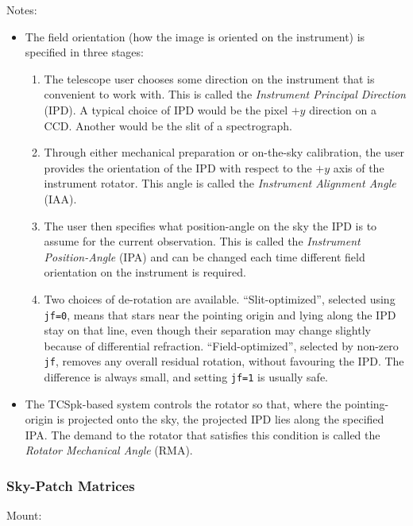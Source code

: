 \documentclass[12pt,fleqn,twoside]{article}
\renewcommand{\_}{{\tt\char'137}}     %
\newcommand{\notelist}  {\goodbreak \vspace{1ex} Notes:
                        \vspace{-3ex}}
\begin{document}
\notelist
\begin{itemize}
\item The field orientation (how the image is oriented on the
      instrument) is specified in three stages:
      \begin{enumerate}
      \item The telescope user chooses some direction on the
            instrument that is convenient to work with.  This is
            called the {\it Instrument Principal Direction}\/ (IPD).  A
            typical choice of IPD would be the pixel $+y$ direction
            on a CCD.  Another would be the slit of a spectrograph.
      \item Through either mechanical preparation or
            on-the-sky calibration, the user provides the
            orientation of the IPD with respect to the $+y$ axis
            of the instrument rotator.  This angle is called the
            {\it Instrument Alignment Angle}\/ (IAA).
      \item The user then specifies what position-angle on the sky
            the IPD is to assume for the current observation.  This
            is called the {\it Instrument Position-Angle}\/ (IPA)
            and can be changed each time different field orientation
            on the instrument is required.
      \item Two choices of de-rotation are available.  ``Slit-optimized'',
            selected using {\tt jf=0}, means that stars near the
            pointing origin and lying along the IPD stay on that line,
            even though their separation may change slightly because
            of differential refraction.  ``Field-optimized'', selected
            by non-zero {\tt jf}, removes any overall residual rotation,
            without favouring the IPD.  The difference is always small,
            and setting {\tt jf=1} is usually safe.
      \end{enumerate}
\item The TCSpk-based system controls the rotator so that, where
      the pointing-origin is projected onto the sky, the projected IPD
      lies along the specified IPA.  The demand to the rotator that
      satisfies this condition is called the {\it Rotator Mechanical
      Angle}\/ (RMA).
\end{itemize}

\subsubsection{Sky-Patch Matrices}
Mount:
\end{document}
